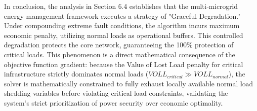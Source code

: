In conclusion, the analysis in Section 6.4 establishes that the multi-microgrid energy management framework executes a strategy of "Graceful Degradation." Under compounding extreme fault conditions, the algorithm incurs maximum economic penalty, utilizing normal loads as operational buffers. This controlled degradation protects the core network, guaranteeing the 100\% protection of critical loads. This phenomenon is a direct mathematical consequence of the objective function gradient: because the Value of Lost Load penalty for critical infrastructure strictly dominates normal loads ($VOLL_{critical} \gg VOLL_{normal}$), the solver is mathematically constrained to fully exhaust locally available normal load shedding variables before violating critical load constraints, validating the system's strict prioritization of power security over economic optimality.
